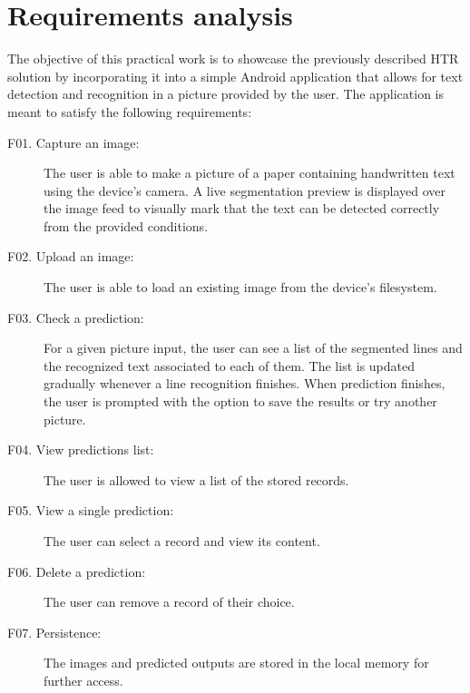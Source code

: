 \section{Requirements analysis}

The objective of this practical work is to showcase the previously described HTR solution by incorporating it into a simple Android application that allows for text detection and recognition in a picture provided by the user. The application is meant to satisfy the following requirements:

\begin{description}   
  \item[F01. Capture an image:] The user is able to make a picture of a paper containing handwritten text using the device's camera. A live segmentation preview is displayed over the image feed to visually mark that the text can be detected correctly from the provided conditions.   
  \item[F02. Upload an image:] The user is able to load an existing image from the device's filesystem.
  \item[F03. Check a prediction:] For a given picture input, the user can see a list of the segmented lines and the recognized text associated to each of them. The list is updated gradually whenever a line recognition finishes. When prediction finishes, the user is prompted with the option to save the results or try another picture.  
  \item[F04. View predictions list:] The user is allowed to view a list of the stored records.
  \item[F05. View a single prediction:] The user can select a record and view its content.
  \item[F06. Delete a prediction:] The user can remove a record of their choice.
  \item[F07. Persistence:] The images and predicted outputs are stored in the local memory for further access.
\end{description}